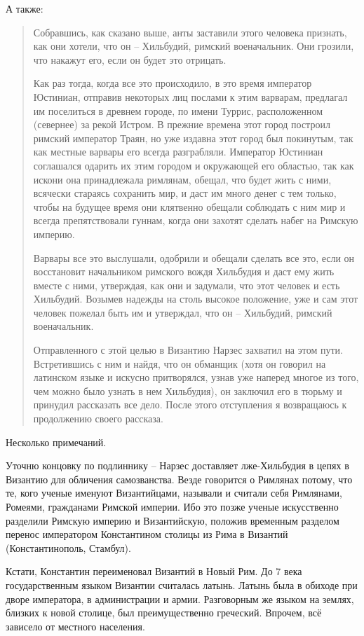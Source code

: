 А также:

\begin{quotation}
Собравшись, как сказано выше, анты заставили этого человека признать, как они хотели, что он – Хильбудий, римский военачальник. Они грозили, что накажут его, если он будет это отрицать.

Как раз тогда, когда все это происходило, в это время император Юстиниан, отправив некоторых лиц послами к этим варварам, предлагал им поселиться в древнем городе, по имени Туррис, расположенном (севернее) за рекой Истром. В прежние времена этот город построил римский император Траян, но уже издавна этот город был покинутым, так как местные варвары его всегда разграбляли. Император Юстиниан соглашался одарить их этим городом и окружающей его областью, так как искони она принадлежала римлянам, обещал, что будет жить с ними, всячески стараясь сохранить мир, и даст им много денег с тем только, чтобы на будущее время они клятвенно обещали соблюдать с ним мир и всегда препятствовали гуннам, когда они захотят сделать набег на Римскую империю.

Варвары все это выслушали, одобрили и обещали сделать все это, если он восстановит начальником римского вождя Хильбудия и даст ему жить вместе с ними, утверждая, как они и задумали, что этот человек и есть Хильбудий. Возымев надежды на столь высокое положение, уже и сам этот человек пожелал быть им и утверждал, что он – Хильбудий, римский военачальник.

Отправленного с этой целью в Византию Нарзес захватил на этом пути. Встретившись с ним и найдя, что он обманщик (хотя он говорил на латинском языке и искусно притворялся, узнав уже наперед многое из того, чем можно было узнать в нем Хильбудия), он заключил его в тюрьму и принудил рассказать все дело. После этого отступления я возвращаюсь к продолжению своего рассказа.
\end{quotation}

Несколько примечаний. 

Уточню концовку по подлиннику – Нарзес доставляет лже-Хильбудия в цепях в Византию для обличения самозванства. Везде говорится о Римлянах потому, что те, кого ученые именуют Византийцами, называли и считали себя Римлянами, Ромеями, гражданами Римской империи. Ибо это позже ученые искусственно разделили Римскую империю и Византийскую, положив временным разделом перенос императором Константином столицы из Рима в Византий (Константинополь, Стамбул). 

Кстати, Константин переименовал Византий в Новый Рим. До 7 века государственным языком Византии считалась латынь. Латынь была в обиходе при дворе императора, в администрации и армии. Разговорным же языком на землях, близких к новой столице, был преимущественно греческий. Впрочем, всё зависело от местного населения.

